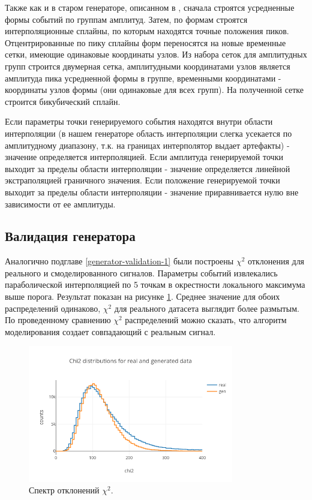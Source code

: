 \documentclass[a4paper,14pt]{extreport}
\begin{document}
Также как и в старом генераторе, описанном в , сначала строятся усредненные формы событий по группам амплитуд. Затем, по формам строятся интерполяционные сплайны, по которым находятся точные положения пиков. Отцентрированные по пику сплайны форм переносятся на новые временные сетки, имеющие одинаковые координаты узлов. Из набора сеток для амплитудных групп строится двумерная сетка,
амплитудными координатами узлов является амплитуда пика усредненной формы в группе, временными координатами - координаты узлов формы (они одинаковые для всех групп). На полученной сетке строится бикубический сплайн.

Если параметры точки генерируемого события находятся внутри области интерполяции (в нашем генераторе область интерполяции слегка усекается по амплитудному диапазону, т.к. на границах интерполятор выдает артефакты) - значение определяется интерполяцией. 
Если амплитуда генерируемой точки выходит за пределы области интерполяции - значение определяется линейной экстраполяцией граничного значения.
Если положение генерируемой точки выходит за пределы области интерполяции - значение приравнивается нулю вне зависимости от ее амплитуды.

\subsection{Валидация генератора}
Аналогично подглаве \ref{generator-validation-1} были построены $ \chi^2 $ отклонения для реального и смоделированного сигналов. Параметры событий извлекались параболической интерполяцией по 5 точкам в окрестности локального максимума выше порога. Результат показан на рисунке \ref{fig:signals-chi2-kotlin}. Среднее значение для обоих распределений одинаково, $ \chi^2 $ для реального датасета выглядит более размытым. По проведенному сравнению $ \chi^2 $ распределений можно сказать, что алгоритм моделирования создает совпадающий с реальным сигнал.

\begin{figure}
  \centering
  \includegraphics[width = 0.8\textwidth]{img/signals/chi2-kotlin.png}
  \caption{Спектр отклонений $ \chi^2 $.}
  \label{fig:signals-chi2-kotlin}
\end{figure}
\end{document}

